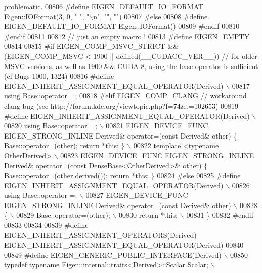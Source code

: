 \begin{DoxyCode}
{       problematic.}
00806 \textcolor{preprocessor}{#define EIGEN\_DEFAULT\_IO\_FORMAT Eigen::IOFormat(3, 0, " ", "\(\backslash\)n", "", "")}
00807 \textcolor{preprocessor}{#else}
00808 \textcolor{preprocessor}{#define EIGEN\_DEFAULT\_IO\_FORMAT Eigen::IOFormat()}
00809 \textcolor{preprocessor}{#endif}
00810 \textcolor{preprocessor}{#endif}
00811 
00812 \textcolor{comment}{// just an empty macro !}
00813 \textcolor{preprocessor}{#define EIGEN\_EMPTY}
00814 
00815 \textcolor{preprocessor}{#if EIGEN\_COMP\_MSVC\_STRICT && (EIGEN\_COMP\_MSVC < 1900 ||  defined(\_\_CUDACC\_VER\_\_)) // for older MSVC
       versions, as well as 1900 && CUDA 8, using the base operator is sufficient (cf Bugs 1000, 1324)}
00816 \textcolor{preprocessor}{  #define EIGEN\_INHERIT\_ASSIGNMENT\_EQUAL\_OPERATOR(Derived) \(\backslash\)}
00817 \textcolor{preprocessor}{    using Base::operator =;}
00818 \textcolor{preprocessor}{#elif EIGEN\_COMP\_CLANG // workaround clang bug (see http://forum.kde.org/viewtopic.php?f=74&t=102653)}
00819 \textcolor{preprocessor}{  #define EIGEN\_INHERIT\_ASSIGNMENT\_EQUAL\_OPERATOR(Derived) \(\backslash\)}
00820 \textcolor{preprocessor}{    using Base::operator =; \(\backslash\)}
00821 \textcolor{preprocessor}{    EIGEN\_DEVICE\_FUNC EIGEN\_STRONG\_INLINE Derived& operator=(const Derived& other) \{
       Base::operator=(other); return *this; \} \(\backslash\)}
00822 \textcolor{preprocessor}{    template <typename OtherDerived> \(\backslash\)}
00823 \textcolor{preprocessor}{    EIGEN\_DEVICE\_FUNC EIGEN\_STRONG\_INLINE Derived& operator=(const DenseBase<OtherDerived>& other) \{
       Base::operator=(other.derived()); return *this; \}}
00824 \textcolor{preprocessor}{#else}
00825 \textcolor{preprocessor}{  #define EIGEN\_INHERIT\_ASSIGNMENT\_EQUAL\_OPERATOR(Derived) \(\backslash\)}
00826 \textcolor{preprocessor}{    using Base::operator =; \(\backslash\)}
00827 \textcolor{preprocessor}{    EIGEN\_DEVICE\_FUNC EIGEN\_STRONG\_INLINE Derived& operator=(const Derived& other) \(\backslash\)}
00828 \textcolor{preprocessor}{    \{ \(\backslash\)}
00829 \textcolor{preprocessor}{      Base::operator=(other); \(\backslash\)}
00830 \textcolor{preprocessor}{      return *this; \(\backslash\)}
00831 \textcolor{preprocessor}{    \}}
00832 \textcolor{preprocessor}{#endif}
00833 
00834 
00839 \textcolor{preprocessor}{#define EIGEN\_INHERIT\_ASSIGNMENT\_OPERATORS(Derived) EIGEN\_INHERIT\_ASSIGNMENT\_EQUAL\_OPERATOR(Derived)}
00840 
00849 \textcolor{preprocessor}{#define EIGEN\_GENERIC\_PUBLIC\_INTERFACE(Derived) \(\backslash\)}
00850 \textcolor{preprocessor}{  typedef typename Eigen::internal::traits<Derived>::Scalar Scalar;  \(\backslash\)}

\end{DoxyCode}
